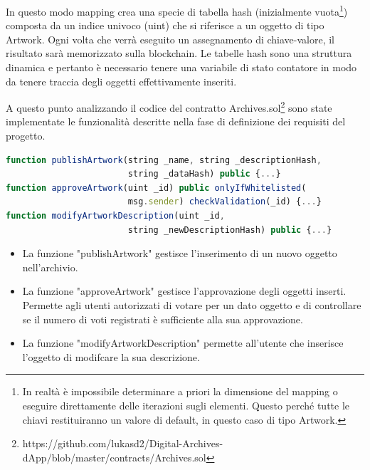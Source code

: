 In questo modo mapping crea una specie di tabella hash (inizialmente vuota\footnote{In realtà è impossibile determinare a priori la dimensione del mapping o eseguire direttamente delle iterazioni sugli elementi. Questo perché tutte le chiavi restituiranno un valore di default, in questo caso di tipo Artwork.}) composta da un indice univoco (uint) che si riferisce a un oggetto di tipo Artwork. Ogni volta che verrà eseguito un assegnamento di chiave-valore, il risultato sarà memorizzato sulla blockchain. Le tabelle hash sono una struttura dinamica e pertanto è necessario tenere una variabile di stato contatore in modo da tenere traccia degli oggetti effettivamente inseriti.

A questo punto analizzando il codice del contratto Archives.sol\footnote{https://github.com/lukasd2/Digital-Archives-dApp/blob/master/contracts/Archives.sol} sono state implementate le funzionalità descritte nella fase di definizione dei requisiti del progetto.
\\
\begin{lstlisting}[caption={Funzioni principali del contratto Archives.sol},language=JavaScript]
function publishArtwork(string _name, string _descriptionHash, 
                        string _dataHash) public {...}
function approveArtwork(uint _id) public onlyIfWhitelisted(
                        msg.sender) checkValidation(_id) {...}
function modifyArtworkDescription(uint _id, 
                        string _newDescriptionHash) public {...}
\end{lstlisting}

\begin{itemize}
\item La funzione "publishArtwork" gestisce l'inserimento di un nuovo oggetto nell'archivio.
\item La funzione "approveArtwork" gestisce l'approvazione degli oggetti inserti. Permette agli utenti autorizzati di votare per un dato oggetto e di controllare se il numero di voti registrati è sufficiente alla sua approvazione.
\item La funzione "modifyArtworkDescription" permette all'utente che inserisce l'oggetto di modifcare la sua descrizione.
\end{itemize}

